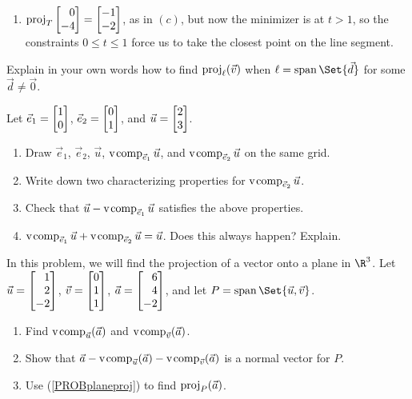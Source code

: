 \begin{exercises}
\begin{problist}
\begin{solution}
\begin{enumerate}
\item $\Proj_T \mat {0\\-4} = \mat {-1\\-2}$, as in $(c)$, but now the minimizer is at $t>1$, so the constraints $0\leq t \leq 1$ force us to take the closest point on the line segment.
			\end{enumerate}
		\end{solution}

	
\prob Explain in your own words 
		how to find $\operatorname{proj}_{\ell}(\vec v)$ when $\ell=\Span\Set{\vec d}$ for some $\vec d \neq \vec 0$.

\prob
Let $\vec e_1=\mat{1 \\ 0}$, $\vec e_2 =\mat{0 \\ 1}$, and $\vec u = \mat{2 \\ 3}$.
\begin{enumerate}
	\item Draw $\vec e_1$, $\vec e_2$, $\vec u$, $\operatorname{\operatorname{v\hspace{1pt}comp}}_{\vec e_1} \vec u$, and $\operatorname{\operatorname{v\hspace{1pt}comp}}_{\vec e_2} \vec u$ on the same grid.
	\item Write down two characterizing properties for $\operatorname{\operatorname{v\hspace{1pt}comp}}_{\vec e_2} \vec u$.
	\item Check that $\vec u - \operatorname{\operatorname{v\hspace{1pt}comp}}_{\vec e_1}\vec u$ satisfies the above properties.
	\item $\operatorname{\operatorname{v\hspace{1pt}comp}}_{{\vec e_1}}\vec u+\operatorname{\operatorname{v\hspace{1pt}comp}}_{{\vec e_2}}\vec u=\vec u$. Does this always happen? Explain.
\end{enumerate}

		\prob In this problem, we will find the projection of a vector
		onto a plane in $\R^3$. Let $\vec u=\mat{1\\2\\-2}$, $\vec v = \mat{0\\1\\1}$,  $\vec a = \mat{6\\4\\-2}$, and let
$P=\Span\Set{\vec u,\vec v}$.

\begin{enumerate}
	\item Find $\operatorname{\operatorname{v\hspace{1pt}comp}}_{\vec u}(\vec a)$ and $\operatorname{\operatorname{v\hspace{1pt}comp}}_{\vec v}(\vec a)$.
	\item \label{PROBplaneproj} Show that $\vec a-\operatorname{\operatorname{v\hspace{1pt}comp}}_{\vec u}(\vec a)-\operatorname{\operatorname{v\hspace{1pt}comp}}_{\vec v}(\vec a)$ is a normal vector for $P$.
	\item Use (\ref{PROBplaneproj}) to find $\operatorname{proj}_P (\vec a)$. 
\end{enumerate}

		\begin{solution}


\end{solution}
\end{problist}
\end{exercises}

